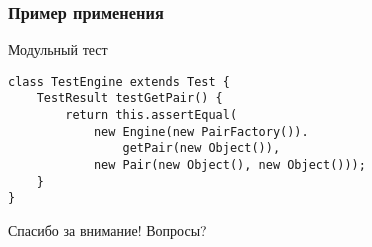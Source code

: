 \documentclass[hyperref=unicode,graphics=pdflatex,13pt]{beamer}
\begin{document}
\begin{frame}[fragile]
\frametitle{Пример применения}
Модульный тест
\begin{lstlisting}
class TestEngine extends Test {
    TestResult testGetPair() {
        return this.assertEqual(
            new Engine(new PairFactory()).
                getPair(new Object()),
            new Pair(new Object(), new Object()));
    }
}
\end{lstlisting}
\end{frame}

\begin{frame}{Спасибо за внимание! Вопросы?}
\end{frame}
\end{document}
